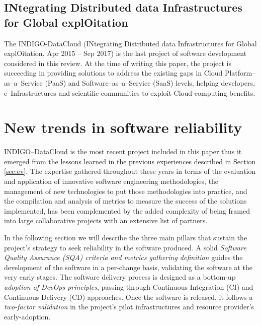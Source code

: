 \documentclass[journal]{IEEEtran}
\begin{document}
\subsection{INtegrating Distributed data Infrastructures for Global
explOitation}

The INDIGO-DataCloud (INtegrating Distributed data Infrastructures for Global
explOitation, Apr 2015 -- Sep 2017) \cite{cordis:indigo} is the last
project of software development considered in this review. At the time of writing
this paper, the project is succeeding in providing solutions to address the existing gaps in
Cloud Platform--as--a--Service (PaaS) and Software--as--a--Service (SaaS) levels,
helping developers, e--Infrastructures and scientific communities to exploit
Cloud computing benefits.

\section{New trends in software reliability}
\label{sec:ntsr}

INDIGO--DataCloud is the most recent project included in this paper thus it
emerged from the lessons learned in the previous experiences described in
Section \ref{sec:ev}. The expertise gathered throughout these years in terms
of the evaluation and application of innovative software engineering
methodologies, the management of new technologies to put those methodologies
into practice, and the compilation and analysis of metrics to measure the
success of the solutions implemented, has been complemented by the added 
complexity of being framed into large collaborative projects with an extensive
list of partners.

In the following section we will describe the three main pillars that sustain the project's strategy to seek reliability in the 
software produced. A solid \textit{Software Quality Assurance (SQA) criteria
and metrics gathering definition} guides the development of the software in
a per-change basis, validating the software at the very early stages. The 
software delivery process is designed as a bottom-up \textit{adoption of DevOps
principles}, passing through Continuous Integration (CI) and Continuous
Delivery (CD) approaches. Once the software is released, it follows a 
\textit{two-factor validation} in the project's pilot infrastructures and
resource provider's early-adoption.

\end{document}
